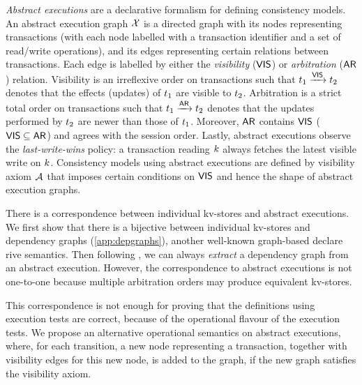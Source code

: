 

\emph{Abstract executions} \cite{ev_transactions,framework-concur} are a declarative formalism for defining consistency models. 
An abstract execution graph $\mathcal{X}$ is a directed graph with its nodes representing transactions 
(with each node labelled with a transaction identifier and a set of read/write operations), 
and its edges representing certain relations between transactions. 
Each edge is labelled by either the \emph{visibility} ($\mathsf{VIS}$) or \emph{arbitration} ($\mathsf{AR}$) relation. 
Visibility is an irreflexive order on transactions such that $t_1 \xrightarrow{\mathsf{VIS}} t_2$ denotes that the effects (updates) of $t_1$ are visible to $t_2$. 
Arbitration is a strict total order on transactions such that $t_1 \xrightarrow{\mathsf{AR}} t_2$ denotes that the updates performed by $t_2$ are newer than those of $t_1$. 
Moreover, $\mathsf{AR}$ contains $\mathsf{VIS}$ ($\mathsf{VIS} \subseteq \mathsf{AR}$) and agrees with the session order.
Lastly, abstract executions observe the \emph{last-write-wins} policy: 
a transaction reading $k$ always fetches the latest visible write on $k$.
Consistency models using abstract executions are defined by visibility axiom \( \visaxioms\) 
that imposes certain conditions on $\mathsf{VIS}$ and hence the shape of abstract execution graphs.

There is a correspondence between individual kv-stores and abstract executions.
We first show that there is a bijective between individual kv-stores and dependency graphs (\cref{app:depgraphs}),
another well-known graph-based declare rive semantics.
Then following \cite{laws}, we can always \emph{extract} a dependency graph from an abstract execution.
However, the correspondence to abstract executions is not one-to-one 
because multiple arbitration orders may produce equivalent kv-stores.

This correspondence is not enough for proving that 
the definitions using execution tests are correct, 
because of the operational flavour of the execution tests.
We propose an alternative operational semantics on abstract executions,
where, for each transition, 
a new node representing a transaction, together with visibility edges for this new node,
is added to the graph, 
if the new graph satisfies the visibility axiom.

